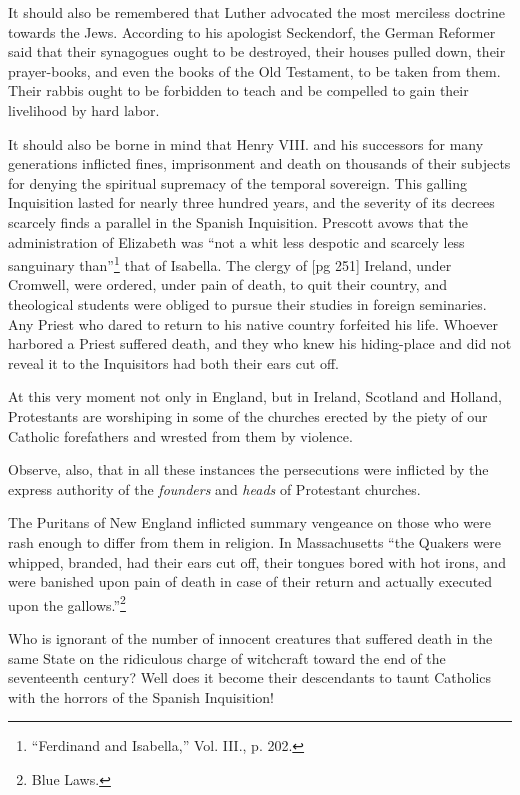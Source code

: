 It should also be remembered that Luther advocated
the most merciless doctrine towards the
Jews. According to his apologist Seckendorf, the
German Reformer said that their synagogues
ought to be destroyed, their houses pulled down,
their prayer-books, and even the books of the Old
Testament, to be taken from them. Their rabbis
ought to be forbidden to teach and be compelled
to gain their livelihood by hard labor.

It should also be borne in mind that Henry
VIII. and his successors for many generations inflicted
fines, imprisonment and death on thousands
of their subjects for denying the spiritual supremacy
of the temporal sovereign. This galling Inquisition
lasted for nearly three hundred years,
and the severity of its decrees scarcely finds a
parallel in the Spanish Inquisition. Prescott
avows that the administration of Elizabeth was
“not a whit less despotic and scarcely less sanguinary
than”\footnote{“Ferdinand and Isabella,”
Vol. III., p. 202.} that of Isabella. The clergy of
[pg 251]
Ireland, under Cromwell, were ordered, under
pain of death, to quit their country, and theological
students were obliged to pursue their studies
in foreign seminaries. Any Priest who dared to
return to his native country forfeited his life.
Whoever harbored a Priest suffered death, and
they who knew his hiding-place and did not reveal
it to the Inquisitors had both their ears cut
off.

At this very moment not only in England, but
in Ireland, Scotland and Holland, Protestants are
worshiping in some of the churches erected by
the piety of our Catholic forefathers and wrested
from them by violence.

Observe, also, that in all these instances the
persecutions were inflicted by the express authority
of the \emph{founders} and \emph{heads} of Protestant
churches.

The Puritans of New England inflicted summary
vengeance on those who were rash enough
to differ from them in religion. In Massachusetts
“the Quakers were whipped, branded, had
their ears cut off, their tongues bored with hot
irons, and were banished upon pain of death in
case of their return and actually executed upon
the gallows.”\footnote{Blue Laws.}

Who is ignorant of the number of innocent creatures
that suffered death in the same State on
the ridiculous charge of witchcraft toward the
end of the seventeenth century? Well does it become
their descendants to taunt Catholics with
the horrors of the Spanish Inquisition!

